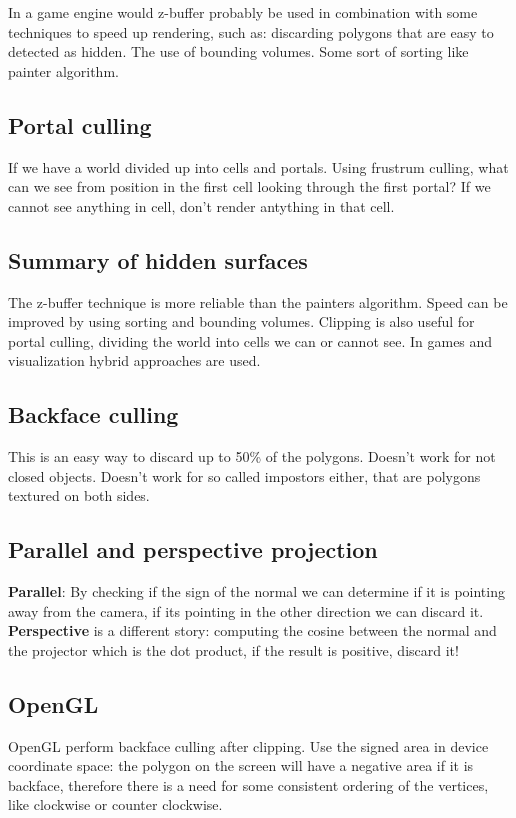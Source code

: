 	In a game engine would z-buffer probably be used in combination with some techniques to speed up rendering, such as: discarding polygons that are easy to detected as hidden. The use of bounding volumes. Some sort of sorting like painter algorithm.

	\subsection*{Portal culling}
	If we have a world divided up into cells and portals. Using frustrum culling, what can we see from position in the first cell looking through the first portal? If we cannot see anything in cell, don't render antything in that cell. 

	\subsection*{Summary of hidden surfaces}
	The z-buffer technique is more reliable than the painters algorithm. Speed can be improved by using sorting and bounding volumes. Clipping is also useful for portal culling, dividing the world into cells we can or cannot see. In games and visualization hybrid approaches are used. 

	\subsection*{Backface culling}
	This is an easy way to discard up to 50\% of the polygons. Doesn't work for not closed objects. Doesn't work for so called impostors either, that are polygons textured on both sides. 


	\subsection*{Parallel and perspective projection}
	\textbf{Parallel}: By checking if the sign of the normal we can determine if it is pointing  away from the camera, if its pointing in the other direction we can discard it.
	\textbf{Perspective} is a different story: computing the cosine between the normal and the projector which is the dot product, if the result is positive, discard it!


	\subsection*{OpenGL}
	OpenGL perform backface culling after clipping. Use the signed area in device coordinate space: the polygon on the screen will have a negative area if it is backface, therefore there is a need for some consistent ordering of the vertices, like clockwise or counter clockwise. 
	













